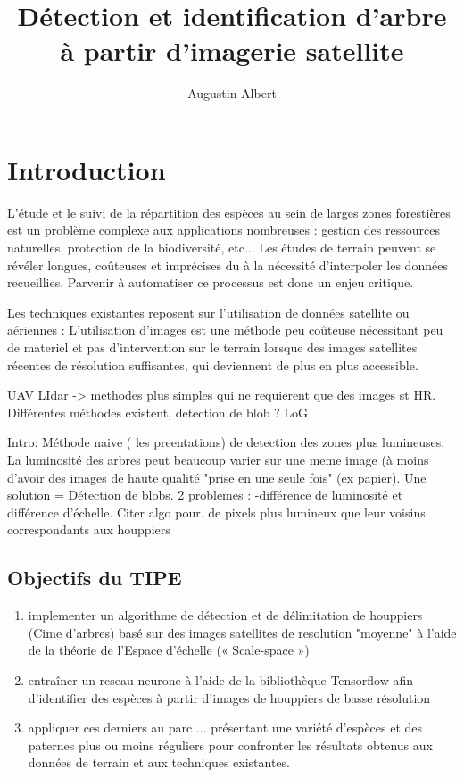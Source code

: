 \documentclass{article}
\title{Détection et identification d'arbre à partir d'imagerie satellite}
\author{Augustin Albert}
\begin{document}
\maketitle
\tableofcontents

\section*{Introduction}

L'étude et le suivi de la répartition des espèces au sein de larges zones forestières est un problème complexe aux applications nombreuses :
gestion des ressources naturelles, protection de la biodiversité, etc... Les études de terrain peuvent se révéler longues, coûteuses et imprécises du à la nécessité d'interpoler les données recueillies. 
Parvenir à automatiser ce processus est donc un enjeu critique. 

Les techniques existantes reposent sur l'utilisation de données satellite ou aériennes : L'utilisation d'images est une méthode peu coûteuse nécessitant peu de materiel et pas d'intervention sur le terrain lorsque 
des images satellites récentes de résolution suffisantes, qui deviennent de plus en plus accessible.  

UAV LIdar -> methodes plus simples qui ne requierent que des images st HR. Différentes méthodes existent, detection de blob ? LoG

Intro: Méthode naive ( les preentations) de detection des zones plus lumineuses. La luminosité des arbres peut beaucoup varier sur une meme image (à moins d'avoir des images de haute qualité "prise en une seule fois" (ex papier). Une solution = Détection de blobs. 2 problemes : -différence de luminosité et différence d'échelle. Citer algo pour. de pixels plus lumineux que leur voisins correspondants aux houppiers

\subsection*{Objectifs du TIPE}		
\begin{enumerate}
	\item implementer un algorithme de détection et de délimitation de houppiers (Cime d'arbres) basé sur des images satellites de resolution "moyenne" à l'aide de la théorie de l'Espace d'échelle (« Scale-space ») 
	\item entraîner un reseau neurone à l'aide de la bibliothèque Tensorflow afin d'identifier des espèces à partir d'images de houppiers de basse résolution 
	\item appliquer ces derniers au parc ... présentant une variété d'espèces et des paternes plus ou moins réguliers pour confronter les résultats obtenus aux données de terrain et aux techniques existantes.    
\end{enumerate}
	
\end{document}
